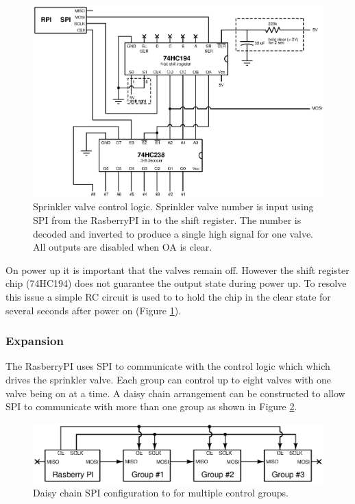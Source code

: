 \documentclass{article}
\begin{document}
\begin{figure}[hbp]
\includegraphics[scale=0.85]{xcircuit/control}
\caption{Sprinkler valve control logic.
Sprinkler valve number is input using SPI from the RasberryPI in
to the shift register.  The number is decoded and inverted to produce
a single high signal for one valve.
All outputs are disabled when OA is clear.}\label{fig:control}
\end{figure}

On power up it is important that the valves remain off.
However the shift register chip (74HC194) does not guarantee
the output state during power up.
To resolve this issue a simple RC circuit is used to to hold the
chip in the clear state for several seconds after power
on (Figure \ref{fig:control}).


\clearpage
\subsubsection{Expansion}
\label{sec:expansion}

The RasberryPI uses SPI to communicate with the
control logic which which drives the sprinkler valve.
Each group can control up to eight valves with one valve
being on at a time.
A daisy chain arrangement can be constructed to allow SPI
to communicate with more than one group as shown in
Figure \ref{fig:expansion_spi}.

\begin{figure}[hbp]
\centering
\includegraphics[angle=0,scale=0.80]{xcircuit/expansion_spi}
\caption{Daisy chain SPI configuration to for multiple control groups.
}\label{fig:expansion_spi}
\end{figure}
\end{document}
